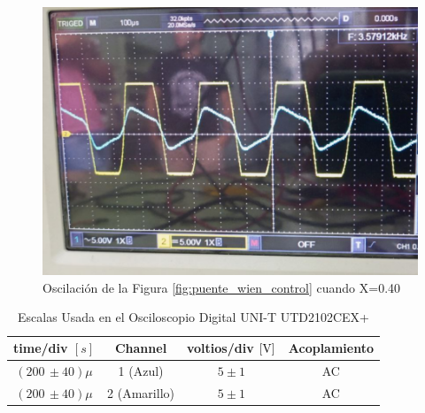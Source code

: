             \begin{figure}[H]
                \centering
                \renewcommand{\figurename}{Imagen}
                \setcounter{figure}{0}
                \includegraphics[width=15cm]{Imagenes/exp_puente_wien_sincontrol4.png}
                \caption{Oscilación de la Figura \ref{fig:puente_wien_control} cuando X=0.40}
                \label{fig:exp_puente_wien_sc4}
            \end{figure}

            \begin{table}[H]
                \centering
                \begin{tabular}{|c|c|c|c|}
                    \hline
                    \textbf{time/div} $[s]$ & \textbf{Channel} & \textbf{voltios/div $[\volt]$} & \textbf{Acoplamiento} \\ \hline
                    $(200 \, \pm 40) \mu  $ & 1 (Azul)  &   $5 \pm 1 $ & AC \\ \hline  
                    $(200 \, \pm 40) \mu  $ & 2 (Amarillo)  &   $5 \pm 1 $ & AC \\ \hline  
                \end{tabular}
                \caption{Escalas Usada en el Osciloscopio Digital UNI-T UTD2102CEX+}
                \label{tab:escala_puente_wien_sc4}
            \end{table}

